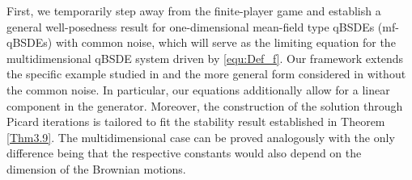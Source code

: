 \documentclass[10pt,a4paper]{article}
\theoremstyle{plain}
\theoremstyle{definition}
\numberwithin{equation}{section}
\begin{document}
First, we temporarily step away from the finite-player game and establish a general well-posedness result for one-dimensional mean-field type qBSDEs (mf-qBSDEs) with common noise, which will serve as the limiting equation for the multidimensional qBSDE system driven by \eqref{equ:Def_f}. Our framework extends the specific example studied in \cite[Theorem 4.1]{RefN10} and the more general form considered in \cite{haowenxiong22} without the common noise. In particular, our equations additionally allow for a linear component in the generator. Moreover, the construction of the solution through Picard iterations is tailored to fit the stability result established in Theorem \ref{Thm3.9}.
The multidimensional case can be proved analogously with the only difference being that the respective constants would also depend on the dimension of the Brownian motions.
\end{document}
